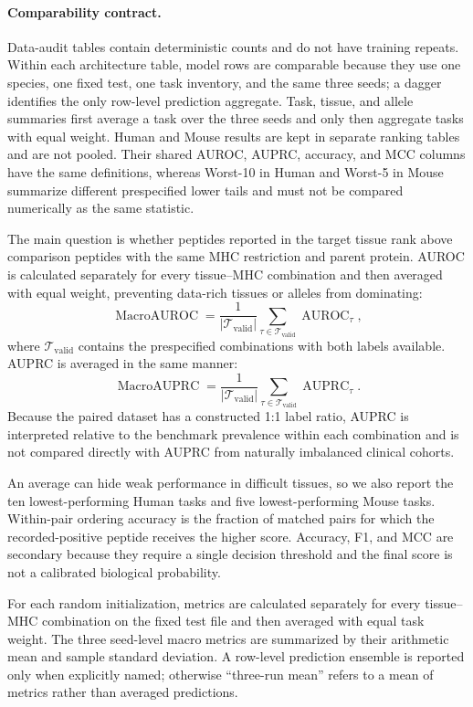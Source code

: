 \paragraph{Comparability contract.}
Data-audit tables contain deterministic counts and do not have training repeats. Within each architecture table, model rows are comparable because they use one species, one fixed test, one task inventory, and the same three seeds; a dagger identifies the only row-level prediction aggregate. Task, tissue, and allele summaries first average a task over the three seeds and only then aggregate tasks with equal weight. Human and Mouse results are kept in separate ranking tables and are not pooled. Their shared AUROC, AUPRC, accuracy, and MCC columns have the same definitions, whereas Worst-10 in Human and Worst-5 in Mouse summarize different prespecified lower tails and must not be compared numerically as the same statistic.

The main question is whether peptides reported in the target tissue rank above comparison peptides with the same MHC restriction and parent protein. AUROC is calculated separately for every tissue--MHC combination and then averaged with equal weight, preventing data-rich tissues or alleles from dominating:
\[
\operatorname{MacroAUROC}
=
\frac{1}{|\mathcal{T}_{\mathrm{valid}}|}
\sum_{\tau\in\mathcal{T}_{\mathrm{valid}}}
\operatorname{AUROC}_{\tau},
\]
where \(\mathcal{T}_{\mathrm{valid}}\) contains the prespecified combinations with both labels available. AUPRC is averaged in the same manner:
\[
\operatorname{MacroAUPRC}
=
\frac{1}{|\mathcal{T}_{\mathrm{valid}}|}
\sum_{\tau\in\mathcal{T}_{\mathrm{valid}}}
\operatorname{AUPRC}_{\tau}.
\]
Because the paired dataset has a constructed 1:1 label ratio, AUPRC is interpreted relative to the benchmark prevalence within each combination and is not compared directly with AUPRC from naturally imbalanced clinical cohorts.

An average can hide weak performance in difficult tissues, so we also report the ten lowest-performing Human tasks and five lowest-performing Mouse tasks. Within-pair ordering accuracy is the fraction of matched pairs for which the recorded-positive peptide receives the higher score. Accuracy, F1, and MCC are secondary because they require a single decision threshold and the final score is not a calibrated biological probability.

For each random initialization, metrics are calculated separately for every tissue--MHC combination on the fixed test file and then averaged with equal task weight. The three seed-level macro metrics are summarized by their arithmetic mean and sample standard deviation. A row-level prediction ensemble is reported only when explicitly named; otherwise “three-run mean” refers to a mean of metrics rather than averaged predictions.

